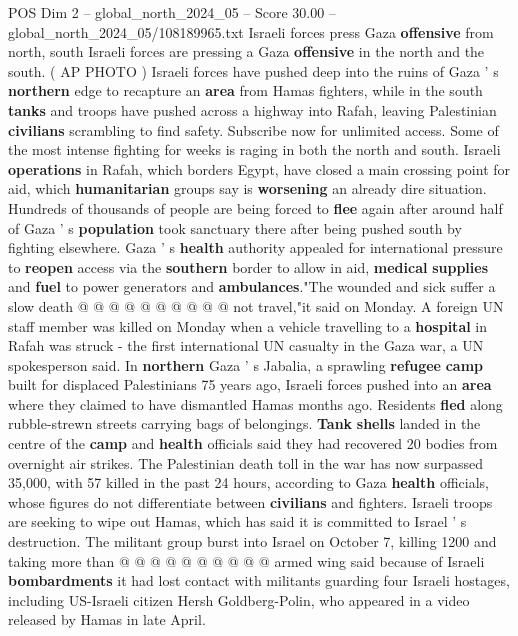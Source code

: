 \begin{textsample}{POS Dim 2 – global\_north\_2024\_05 – Score 30.00 – global\_north\_2024\_05/108189965.txt}  \label{ex:f2_pos_296}
Israeli forces press Gaza \textbf{offensive} from north, south Israeli forces are pressing a Gaza \textbf{offensive} in the north and the south. ( AP PHOTO ) Israeli forces have pushed deep into the ruins of Gaza ' s \textbf{northern} edge to recapture an \textbf{area} from Hamas fighters, while in the south \textbf{tanks} and troops have pushed across a highway into Rafah, leaving Palestinian \textbf{civilians} scrambling to find safety.
Subscribe now for unlimited access.
Some of the most intense fighting for weeks is raging in both the north and south.
Israeli \textbf{operations} in Rafah, which borders Egypt, have closed a main crossing point for aid, which \textbf{humanitarian} groups say is \textbf{worsening} an already dire situation.
Hundreds of thousands of people are being forced to \textbf{flee} again after around half of Gaza ' s \textbf{population} took sanctuary there after being pushed south by fighting elsewhere.
Gaza ' s \textbf{health} authority appealed for international pressure to \textbf{reopen} access via the \textbf{southern} border to allow in aid, \textbf{medical} \textbf{supplies} and \textbf{fuel} to power generators and \textbf{ambulances}."The wounded and sick suffer a slow death @ @ @ @ @ @ @ @ @ @ not travel,"it said on Monday.
A foreign UN staff member was killed on Monday when a vehicle travelling to a \textbf{hospital} in Rafah was struck - the first international UN casualty in the Gaza war, a UN spokesperson said.
In \textbf{northern} Gaza ' s Jabalia, a sprawling \textbf{refugee} \textbf{camp} built for displaced Palestinians 75 years ago, Israeli forces pushed into an \textbf{area} where they claimed to have dismantled Hamas months ago.
Residents \textbf{fled} along rubble-strewn streets carrying bags of belongings. \textbf{Tank} \textbf{shells} landed in the centre of the \textbf{camp} and \textbf{health} officials said they had recovered 20 bodies from overnight air strikes.
The Palestinian death toll in the war has now surpassed 35,000, with 57 killed in the past 24 hours, according to Gaza \textbf{health} officials, whose figures do not differentiate between \textbf{civilians} and fighters.
Israeli troops are seeking to wipe out Hamas, which has said it is committed to Israel ' s destruction.
The militant group burst into Israel on October 7, killing 1200 and taking more than @ @ @ @ @ @ @ @ @ @ armed wing said because of Israeli \textbf{bombardments} it had lost contact with militants guarding four Israeli hostages, including US-Israeli citizen Hersh Goldberg-Polin, who appeared in a video released by Hamas in late April.

\end{textsample}
